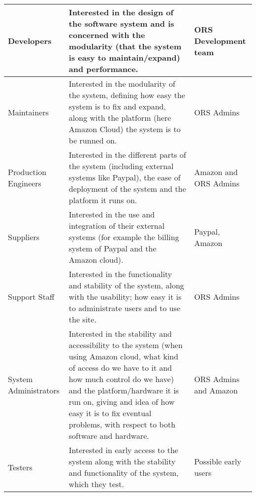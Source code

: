 \begin{center}
\begin{longtable}[H]{| l |  p{6cm} | p{2cm} |}
    \hline
    Developers & Interested in the design of the software system and is 
        concerned with the modularity (that the system is easy to 
        maintain/expand) and performance. & ORS Development team\\
    \hline
    Maintainers & Interested in the modularity of the system, defining how easy
        the system is to fix and expand, along with the platform (here Amazon 
        Cloud) the system is to be runned on. & ORS Admins \\
    \hline
    Production Engineers & Interested in the different parts of the system 
        (including external systems like Paypal), the ease of deployment of the
        system and the platform it runs on. & Amazon and ORS Admins\\
    \hline
    Suppliers & Interested in the use and integration of their external systems
        (for example the billing system of Paypal and the Amazon cloud). 
        & Paypal, Amazon\\
    \hline
    Support Staff & Interested in the functionality and stability of the system,
        along with the usability; how easy it is to administrate users and to 
        use the site. & ORS Admins \\
    \hline
    System Administrators & Interested in the stability and accessibility to 
        the system (when using Amazon cloud, what kind of access do we have to 
        it and how much control do we have) and the platform/hardware it is run
        on, giving and idea of how easy it is to fix eventual problems, with 
        respect to both software and hardware. & ORS Admins and Amazon \\
    \hline
    Testers & Interested in early access to the system along with the stability
        and functionality of the system, which they test. 
        & Possible early users\\
    \hline
  \end{longtable}
\end{center}


